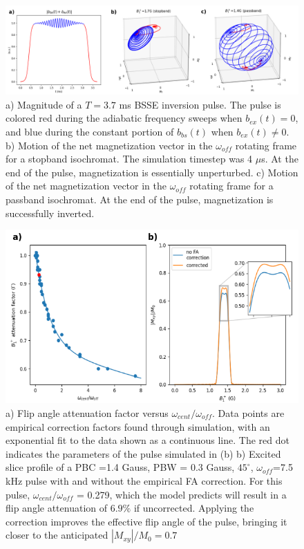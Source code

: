 \documentclass{article}
\newcommand{\bext}{b_{ex}(t)}
\newcommand{\bbst}{b_{bs}(t)}
\begin{document}
\begin{figure}[h]
\centering
\includegraphics[width=1.1\textwidth]{figures/trajectory_figure.png}
\caption{a) Magnitude of a $T = 3.7$ ms BSSE inversion pulse. 
The pulse is colored red during the adiabatic frequency sweeps when $\bext = 0$, and blue during the constant portion of $\bbst$ when $\bext \neq 0$. 
b) Motion of the net magnetization vector in the $\omega_{off}$ rotating frame for a stopband isochromat. 
The simulation timestep was 4 $\mu$s. At the end of the pulse, magnetization is essentially unperturbed.
c) Motion of the net magnetization vector in the $\omega_{off}$ rotating frame for a passband isochromat. 
At the end of the pulse, magnetization is successfully inverted.}
\label{fig:motion}
\end{figure}

\begin{figure}[h]
\centering
\includegraphics[width=1.\textwidth]{figures/correction_fact_processed_fa_only.png}
\caption{a) Flip angle attenuation factor versus $ \omega_{cent}/\omega_{off}$.
Data points are empirical correction factors found through simulation, 
with an exponential fit to the data shown as a continuous line. 
The red dot indicates the parameters of the pulse simulated in (b)
b) Excited slice profile of a PBC =1.4 Gauss, PBW = 0.3 Gauss, 
$45^\circ$, $\omega_{off}$=7.5 kHz pulse with and without the empirical FA correction. For this pulse, $\omega_{cent}/\omega_{off}$ = 0.279, which the model predicts will result in a flip angle attenuation of $6.9\%$ if uncorrected.
Applying the correction improves the effective flip angle of the pulse, bringing it closer to the anticipated $|M_{xy}|/M_0 = 0.7$
}
\label{fig:corrs}
\end{figure}
\end{document}
